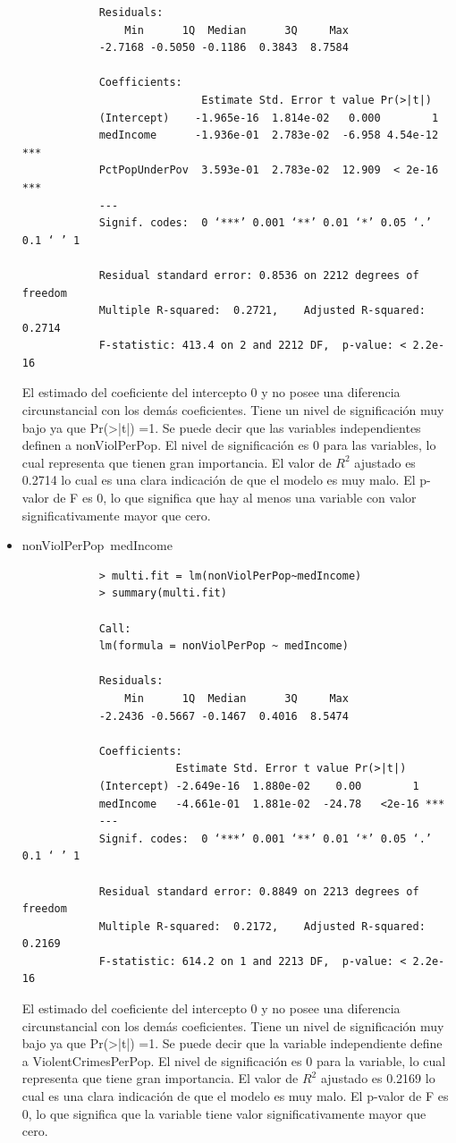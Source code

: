 \documentclass[a4paper,10pt,twocolumn]{article}
\begin{document}
\begin{itemize}
\begin{verbatim}
			Residuals:
				Min      1Q  Median      3Q     Max 
			-2.7168 -0.5050 -0.1186  0.3843  8.7584 

			Coefficients:
							Estimate Std. Error t value Pr(>|t|)    
			(Intercept)    -1.965e-16  1.814e-02   0.000        1    
			medIncome      -1.936e-01  2.783e-02  -6.958 4.54e-12 ***
			PctPopUnderPov  3.593e-01  2.783e-02  12.909  < 2e-16 ***
			---
			Signif. codes:  0 ‘***’ 0.001 ‘**’ 0.01 ‘*’ 0.05 ‘.’ 0.1 ‘ ’ 1

			Residual standard error: 0.8536 on 2212 degrees of freedom
			Multiple R-squared:  0.2721,	Adjusted R-squared:  0.2714 
			F-statistic: 413.4 on 2 and 2212 DF,  p-value: < 2.2e-16

		\end{verbatim}

	El estimado del coeficiente del intercepto 0 y no posee una diferencia circunstancial con los demás coeficientes. Tiene un nivel de significación muy bajo ya que Pr(>|t|) =1.
	Se puede decir que las variables independientes definen a nonViolPerPop. El nivel de significación es 0 para las variables, lo cual representa que tienen gran importancia. El valor de $R^2$ ajustado es 0.2714 lo cual es una clara indicación de que el modelo es muy malo. El p-valor de F es 0, lo que significa que hay al menos una variable con valor significativamente mayor que cero.

	\item {nonViolPerPop~medIncome}
		\begin{verbatim}
			> multi.fit = lm(nonViolPerPop~medIncome)
			> summary(multi.fit)

			Call:
			lm(formula = nonViolPerPop ~ medIncome)

			Residuals:
				Min      1Q  Median      3Q     Max 
			-2.2436 -0.5667 -0.1467  0.4016  8.5474 

			Coefficients:
						Estimate Std. Error t value Pr(>|t|)    
			(Intercept) -2.649e-16  1.880e-02    0.00        1    
			medIncome   -4.661e-01  1.881e-02  -24.78   <2e-16 ***
			---
			Signif. codes:  0 ‘***’ 0.001 ‘**’ 0.01 ‘*’ 0.05 ‘.’ 0.1 ‘ ’ 1

			Residual standard error: 0.8849 on 2213 degrees of freedom
			Multiple R-squared:  0.2172,	Adjusted R-squared:  0.2169 
			F-statistic: 614.2 on 1 and 2213 DF,  p-value: < 2.2e-16
		\end{verbatim}

	El estimado del coeficiente del intercepto 0 y no posee una diferencia circunstancial con los demás coeficientes. Tiene un nivel de significación muy bajo ya que Pr(>|t|) =1.
	Se puede decir que la variable independiente define a ViolentCrimesPerPop. El nivel de significación es 0 para la variable, lo cual representa que tiene gran importancia. El valor de $R^2$ ajustado es 0.2169 lo cual es una clara indicación de que el modelo es muy malo. El p-valor de F es 0, lo que significa que la variable tiene valor significativamente mayor que cero.


\end{itemize}
\end{document}
